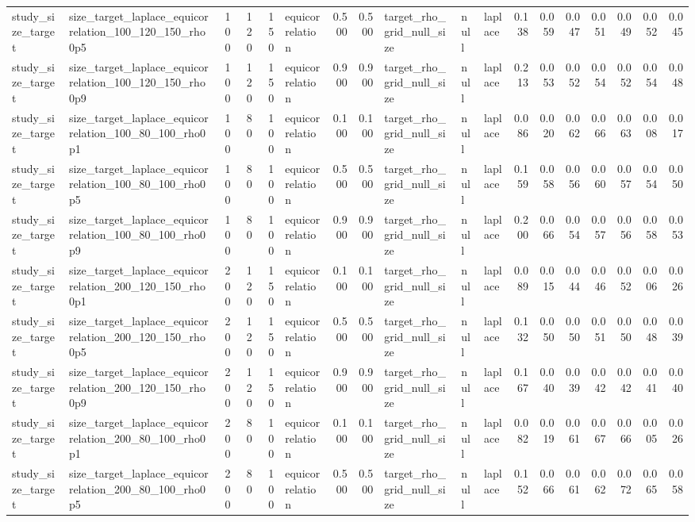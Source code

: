 \begin{tabular}{llrrrlrrlllrrrrrrr}
study\_size\_target & size\_target\_laplace\_equicorrelation\_100\_120\_150\_rho0p5 & 100 & 120 & 150 & equicorrelation & 0.500 & 0.500 & target\_rho\_grid\_null\_size & null & laplace & 0.138 & 0.059 & 0.047 & 0.051 & 0.049 & 0.052 & 0.045 \\
study\_size\_target & size\_target\_laplace\_equicorrelation\_100\_120\_150\_rho0p9 & 100 & 120 & 150 & equicorrelation & 0.900 & 0.900 & target\_rho\_grid\_null\_size & null & laplace & 0.213 & 0.053 & 0.052 & 0.054 & 0.052 & 0.054 & 0.048 \\
study\_size\_target & size\_target\_laplace\_equicorrelation\_100\_80\_100\_rho0p1 & 100 & 80 & 100 & equicorrelation & 0.100 & 0.100 & target\_rho\_grid\_null\_size & null & laplace & 0.086 & 0.020 & 0.062 & 0.066 & 0.063 & 0.008 & 0.017 \\
study\_size\_target & size\_target\_laplace\_equicorrelation\_100\_80\_100\_rho0p5 & 100 & 80 & 100 & equicorrelation & 0.500 & 0.500 & target\_rho\_grid\_null\_size & null & laplace & 0.159 & 0.058 & 0.056 & 0.060 & 0.057 & 0.054 & 0.050 \\
study\_size\_target & size\_target\_laplace\_equicorrelation\_100\_80\_100\_rho0p9 & 100 & 80 & 100 & equicorrelation & 0.900 & 0.900 & target\_rho\_grid\_null\_size & null & laplace & 0.200 & 0.066 & 0.054 & 0.057 & 0.056 & 0.058 & 0.053 \\
study\_size\_target & size\_target\_laplace\_equicorrelation\_200\_120\_150\_rho0p1 & 200 & 120 & 150 & equicorrelation & 0.100 & 0.100 & target\_rho\_grid\_null\_size & null & laplace & 0.089 & 0.015 & 0.044 & 0.046 & 0.052 & 0.006 & 0.026 \\
study\_size\_target & size\_target\_laplace\_equicorrelation\_200\_120\_150\_rho0p5 & 200 & 120 & 150 & equicorrelation & 0.500 & 0.500 & target\_rho\_grid\_null\_size & null & laplace & 0.132 & 0.050 & 0.050 & 0.051 & 0.050 & 0.048 & 0.039 \\
study\_size\_target & size\_target\_laplace\_equicorrelation\_200\_120\_150\_rho0p9 & 200 & 120 & 150 & equicorrelation & 0.900 & 0.900 & target\_rho\_grid\_null\_size & null & laplace & 0.167 & 0.040 & 0.039 & 0.042 & 0.042 & 0.041 & 0.040 \\
study\_size\_target & size\_target\_laplace\_equicorrelation\_200\_80\_100\_rho0p1 & 200 & 80 & 100 & equicorrelation & 0.100 & 0.100 & target\_rho\_grid\_null\_size & null & laplace & 0.082 & 0.019 & 0.061 & 0.067 & 0.066 & 0.005 & 0.026 \\
study\_size\_target & size\_target\_laplace\_equicorrelation\_200\_80\_100\_rho0p5 & 200 & 80 & 100 & equicorrelation & 0.500 & 0.500 & target\_rho\_grid\_null\_size & null & laplace & 0.152 & 0.066 & 0.061 & 0.062 & 0.072 & 0.065 & 0.058 \\

\end{tabular}
